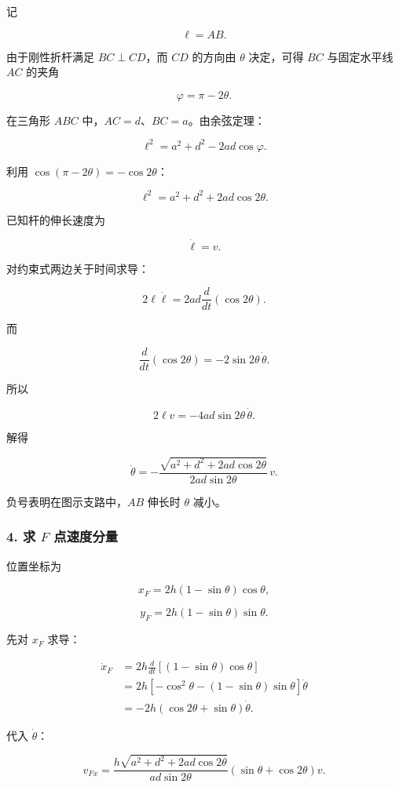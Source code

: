 \documentclass[12pt,a4paper,UTF8]{ctexart}
\begin{document}
记

\[
\ell=AB.
\]

由于刚性折杆满足 \(BC\perp CD\)，而 \(CD\) 的方向由 \(\theta\)
决定，可得 \(BC\) 与固定水平线 \(AC\) 的夹角

\[
\varphi=\pi-2\theta.
\]

在三角形 \(ABC\) 中，\(AC=d\)、\(BC=a\)。由余弦定理：

\[
\ell^2=a^2+d^2-2ad\cos\varphi.
\]

利用 \(\cos(\pi-2\theta)=-\cos2\theta\)：

\[
\boxed{
\ell^2=a^2+d^2+2ad\cos2\theta
}.
\]

已知杆的伸长速度为

\[
\dot\ell=v.
\]

对约束式两边关于时间求导：

\[
2\ell\dot\ell
=2ad\frac{d}{dt}(\cos2\theta).
\]

而

\[
\frac{d}{dt}(\cos2\theta)
=-2\sin2\theta\,\dot\theta.
\]

所以

\[
2\ell v=-4ad\sin2\theta\,\dot\theta.
\]

解得

\[
\boxed{
\dot\theta
=-\frac{\sqrt{a^2+d^2+2ad\cos2\theta}}
{2ad\sin2\theta}\,v
}.
\]

负号表明在图示支路中，\(AB\) 伸长时 \(\theta\) 减小。

\subsubsection{\texorpdfstring{4. 求 \(F\)
点速度分量}{4. 求 F 点速度分量}}\label{ux6c42-f-ux70b9ux901fux5ea6ux5206ux91cf}

位置坐标为

\[
x_F=2h(1-\sin\theta)\cos\theta,
\]

\[
y_F=2h(1-\sin\theta)\sin\theta.
\]

先对 \(x_F\) 求导：

\[
\begin{aligned}
\dot x_F
&=2h\frac{d}{dt}\left[(1-\sin\theta)\cos\theta\right]\\
&=2h\left[-\cos^2\theta-(1-\sin\theta)\sin\theta\right]\dot\theta\\
&=-2h\left(\cos2\theta+\sin\theta\right)\dot\theta.
\end{aligned}
\]

代入 \(\dot\theta\)：

\[
\boxed{
v_{Fx}
=\frac{h\sqrt{a^2+d^2+2ad\cos2\theta}}
{ad\sin2\theta}
(\sin\theta+\cos2\theta)v
}.
\]
\end{document}
